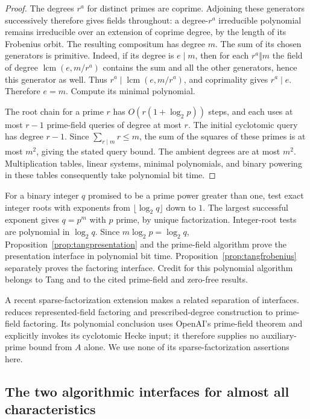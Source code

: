 \documentclass[11pt]{article}
\theoremstyle{definition}
\theoremstyle{remark}
\begin{document}
\begin{proof}
The degrees $r^a$ for distinct primes are coprime. Adjoining these
generators successively therefore gives fields throughout: a
degree-$r^a$ irreducible polynomial remains irreducible over an
extension of coprime degree, by the length of its Frobenius orbit.
The resulting compositum has degree $m$. The sum of its chosen
generators is primitive. Indeed, if its degree is $e\mid m$, then
for each $r^a\Vert m$ the field of degree
$\operatorname{lcm}(e,m/r^a)$ contains the sum and all the other
generators, hence this generator as well. Thus
$r^a\mid\operatorname{lcm}(e,m/r^a)$, and coprimality gives
$r^a\mid e$. Therefore $e=m$. Compute its minimal polynomial.

The root chain for a prime $r$ has
$O(r(1+\log_2p))$ steps, and each uses at most $r-1$ prime-field
queries of degree at most $r$. The initial cyclotomic query has
degree $r-1$. Since $\sum_{r\mid m}r\leq m$, the sum of the
squares of these primes is at most $m^2$, giving the stated query
bound. The ambient degrees are at most $m^2$. Multiplication tables,
linear systems, minimal polynomials, and binary powering in these
tables consequently take polynomial bit time.
\end{proof}

For a binary integer $q$ promised to be a prime power greater than
one, test exact integer roots with exponents from
$\lfloor\log_2q\rfloor$ down to $1$. The largest successful
exponent gives $q=p^m$ with $p$ prime, by unique factorization.
Integer-root tests are polynomial in $\log_2q$. Since
$m\log_2p=\log_2q$, Proposition~\ref{prop:tangpresentation} and
the prime-field algorithm prove the presentation interface in
polynomial bit time. Proposition~\ref{prop:tangfrobenius} separately
proves the factoring interface. Credit for this polynomial algorithm
belongs to Tang and to the cited prime-field and zero-free results.


A recent sparse-factorization extension makes a related separation of
interfaces. \citet[Theorem~2, pp.~5--6; Section~4 and Corollary~3,
p.~7]{Kriebel2026} reduces represented-field factoring and prescribed-degree
construction to prime-field factoring. Its polynomial conclusion uses
OpenAI's prime-field theorem and explicitly invokes its cyclotomic
Hecke input; it therefore supplies no auxiliary-prime bound from \(A\)
alone. We use none of its sparse-factorization assertions here.

\subsection{The two algorithmic interfaces for almost all characteristics}
\label{sec:almost-all-12r}
\end{document}
